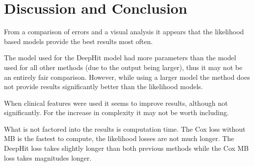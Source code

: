 \vspace{-0.25cm}

\section{Discussion and Conclusion} \label{sec:discussion}
    From a comparison of errors and a visual analysis it appears that the likelihood based models provide the best results most often.
    
    The model used for the DeepHit model had more parameters than the model used for all other methods (due to the output being larger), thus it may not be an entirely fair comparison. However, while using a larger model the method does not provide results significantly better than the likelihood models.
    
    When clinical features were used it seems to improve results, although not significantly. For the increase in complexity it may not be worth including.
    
    What is not factored into the results is computation time. The Cox loss without \gls{MB} is the fastest to compute, the likelihood losses are not much longer. The DeepHit loss takes slightly longer than both previous methods while the Cox \gls{MB} loss takes magnitudes longer.

